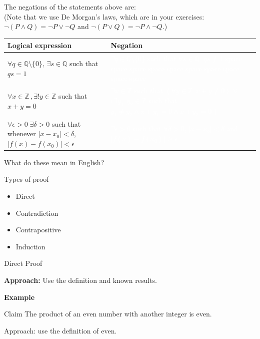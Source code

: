 \documentclass [aspectratio=169]{beamer}
\newcommand{\Z}{{\mathbb{Z}}}
\newcommand{\Q}{{\mathbb{Q}}}
\begin{document}
\begin{frame}

The negations of the statements above are: \\
 (Note that we use De Morgan's laws, which are in your exercises: \\
 $\neg (P \wedge Q) = \neg P \vee \neg Q$ and $\neg (P \vee Q) = \neg P \wedge \neg Q$.)

\vspace{1em}

\begin{tabular}{p{} p{}}
     Logical expression & Negation \\
     \hline
     $\forall q \in \Q \setminus \{0\}, \, \exists s \in \Q$ such that $qs=1$ & \textcolor{white}{$\exists q \in \Q \setminus \{0\}$ such that  $\forall s \in \Q, \, qs \neq 1$ space space space space space space space space space space}\\
     $\forall x \in \Z \, , \exists ! y \in \Z$ such that $x+y = 0$ & \textcolor{white}{$\exists x \in \Z$ such  that $(\forall y \in \Z, x+y \neq 0)$ $\vee$ $(\exists y_1, y_2 \in \Z$ such that $y_1 \neq y_2 \wedge x+y_1 = 0 \wedge x+y_2 = 0$  )} \\
     $\forall \epsilon >0 \; \exists \delta > 0$ such that whenever $|x - x_0| < \delta$, $|f(x)-f(x_0)| < \epsilon$ & \textcolor{white}{$\exists \epsilon >0$ such that $\forall \delta > 0$,  $|x - x_0| < \delta$ and  $|f(x)-f(x_0)| \geq \epsilon$}
\end{tabular}

\vspace{1em}

What do these mean in English?
\end{frame}


\begin{frame}{Types of proof}
\begin{itemize}
	\item Direct
	\item Contradiction
	\item Contrapositive
	\item Induction
\end{itemize}
\end{frame}

\begin{frame}{Direct Proof}

{\bf Approach:} Use the definition and known results. \\
\vspace{1em}

\large{\bf Example}

\begin{exampleblock}{Claim}
The product of an even number with another integer is even.
\end{exampleblock}

\vspace{1em}
Approach: use the definition of even.




\end{frame}
\end{document}

